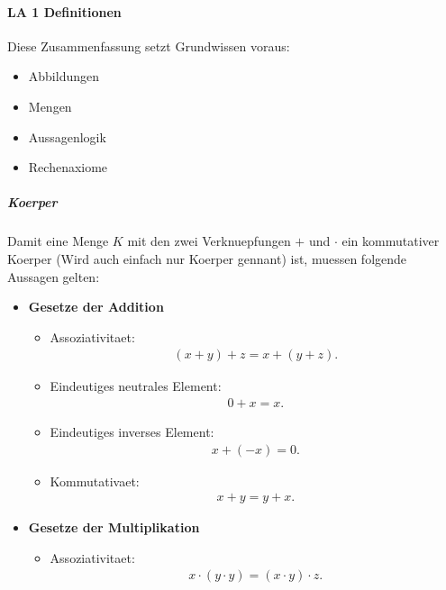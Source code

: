 \documentclass[12pt]{article}
\begin{document}
\paragraph{\Large LA 1 Definitionen}
\begin{flushleft}
    Diese Zusammenfassung setzt Grundwissen voraus:
    \begin{itemize}
        \item Abbildungen
        \item Mengen
        \item Aussagenlogik
        \item Rechenaxiome
    \end{itemize}
\end{flushleft}
\vspace{1cm}
\subparagraph{\large Koerper}
\normalsize
\begin{flushleft}
    Damit eine Menge $K$ mit den zwei Verknuepfungen $+$ und $\cdot$ ein kommutativer Koerper (Wird auch einfach nur Koerper gennant) ist, muessen folgende Aussagen gelten:
    \begin{itemize}
        \item \textbf{Gesetze der Addition}
        \begin{itemize}
            \item Assoziativitaet: \begin{align*}
                (x + y) + z = x + (y + z).
            \end{align*}
            \item Eindeutiges neutrales Element: \begin{align*}
                0 + x = x.
            \end{align*}
            \item Eindeutiges inverses Element: \begin{align*}
                x + (-x) = 0.
            \end{align*}
            \item Kommutativaet: \begin{align*}
                x + y = y + x.
            \end{align*}
        \end{itemize}
        \item \textbf{Gesetze der Multiplikation}
        \begin{itemize}
            \item Assoziativitaet: \begin{align*}
                x \cdot (y \cdot y) = (x \cdot y) \cdot z.

\end{align*}
\end{itemize}
\end{itemize}
\end{flushleft}
\end{document}
